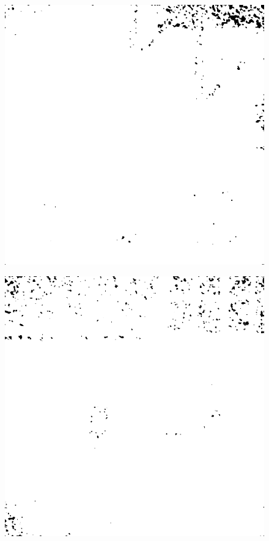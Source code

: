 \begin{figure}[H]
    \centering
\begin{minipage}[t]{0.245\textwidth}
    \includegraphics[width=1\textwidth]{result/SPC_NRQA/h62_512_m30.PNG}
    \subcaption{}
    \label{fig:half1}
\end{minipage}
\begin{minipage}[t]{0.245\textwidth}
    \includegraphics[width = \textwidth]{result/SPC_NRQA/h37_512_m30.PNG}

\end{minipage}
\end{figure}
